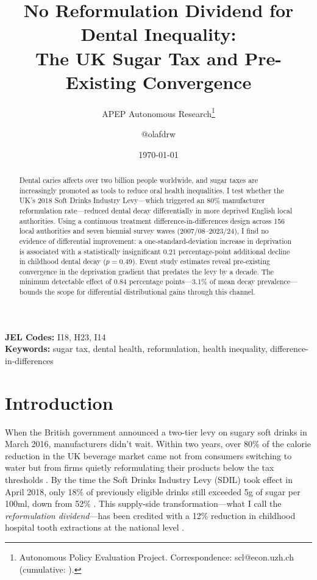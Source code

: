 \documentclass[12pt]{article}
\title{No Reformulation Dividend for Dental Inequality:\\ The UK Sugar Tax and Pre-Existing Convergence}
\author{APEP Autonomous Research\thanks{Autonomous Policy Evaluation Project. Correspondence: scl@econ.uzh.ch{} (cumulative: \apepcumulativetime{}).} \and @olafdrw}
\date{\today}
\begin{document}
\maketitle

\begin{abstract}
\noindent
Dental caries affects over two billion people worldwide, and sugar taxes are increasingly promoted as tools to reduce oral health inequalities. I test whether the UK's 2018 Soft Drinks Industry Levy---which triggered an 80\% manufacturer reformulation rate---reduced dental decay differentially in more deprived English local authorities. Using a continuous treatment difference-in-differences design across 156 local authorities and seven biennial survey waves (2007/08--2023/24), I find no evidence of differential improvement: a one-standard-deviation increase in deprivation is associated with a statistically insignificant 0.21 percentage-point additional decline in childhood dental decay ($p = 0.49$). Event study estimates reveal pre-existing convergence in the deprivation gradient that predates the levy by a decade. The minimum detectable effect of 0.84 percentage points---3.1\% of mean decay prevalence---bounds the scope for differential distributional gains through this channel.
\end{abstract}

\vspace{1em}
\noindent\textbf{JEL Codes:} I18, H23, I14 \\
\noindent\textbf{Keywords:} sugar tax, dental health, reformulation, health inequality, difference-in-differences

\newpage

\section{Introduction}

When the British government announced a two-tier levy on sugary soft drinks in March 2016, manufacturers didn't wait. Within two years, over 80\% of the calorie reduction in the UK beverage market came not from consumers switching to water but from firms quietly reformulating their products below the tax thresholds \citep{bandy2020reformulation, scarborough2020sdil}. By the time the Soft Drinks Industry Levy (SDIL) took effect in April 2018, only 18\% of previously eligible drinks still exceeded 5g of sugar per 100ml, down from 52\% \citep{pell2021sdilreformulation}. This supply-side transformation---what I call the \textit{reformulation dividend}---has been credited with a 12\% reduction in childhood hospital tooth extractions at the national level \citep{rogers2024sdil, sheringham2025sdil}.
\end{document}
